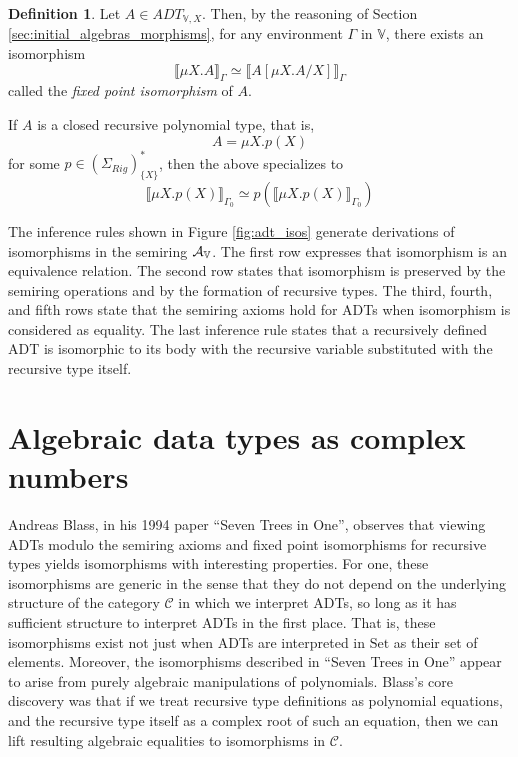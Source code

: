\documentclass{msthesis}
\theoremstyle{definition}
\newtheorem{definition}[theorem]{Definition}
\newcommand{\semof}[1]{\llbracket{#1}\rrbracket}
\newcommand{\mcC}{\mathcal{C}}
\newcommand{\Set}{\ensuremath{\mathrm{Set}}}
\newcommand{\vars}{\mathbb{V}}
\begin{document}
\begin{definition}
Let $A \in ADT_{\vars,X}$. Then, by the reasoning of Section \ref{sec:initial_algebras_morphisms}, for any environment $\Gamma$ in $\vars$, there exists an isomorphism
\[ \semof{\mu X.A}_\Gamma \simeq \semof{A[\mu X.A/X]}_\Gamma \]
called the \emph{fixed point isomorphism} of $A$.
\end{definition}

If $A$ is a closed recursive polynomial type, that is,
\[ A = \mu X.p(X) \]
for some $p \in (\Sigma_{Rig})^*_{\{X\}}$, then the above specializes to
\[ \semof{\mu X.p(X)}_{\Gamma_0} \simeq p(\semof{\mu X.p(X)}_{\Gamma_0}) \]

The inference rules shown in Figure \ref{fig:adt_isos} generate derivations of isomorphisms in the semiring $\ADTrig$.  The first row expresses that isomorphism is an equivalence relation. The second row states that isomorphism is preserved by the semiring operations and by the formation of recursive types. The third, fourth, and fifth rows state that the semiring axioms hold for ADTs when isomorphism is considered as equality.  The last inference rule states that a recursively defined ADT is isomorphic to its body with the recursive variable substituted with the recursive type itself.

\section{Algebraic data types as complex numbers}

Andreas Blass, in his 1994 paper ``Seven Trees in One'', observes that viewing ADTs modulo the semiring axioms and fixed point isomorphisms for recursive types yields isomorphisms with interesting properties.  For one, these isomorphisms are generic in the sense that they do not depend on the underlying structure of the category $\mcC$ in which we interpret ADTs, so long as it has sufficient structure to interpret ADTs in the first place. That is, these isomorphisms exist not just when ADTs are interpreted in $\Set$ as their set of elements.  Moreover, the isomorphisms described in ``Seven Trees in One'' appear to arise from purely algebraic manipulations of polynomials.  Blass's core discovery was that if we treat recursive type definitions as polynomial equations, and the recursive type itself as a complex root of such an equation, then we can lift resulting algebraic equalities to isomorphisms in $\mcC$.
\end{document}
